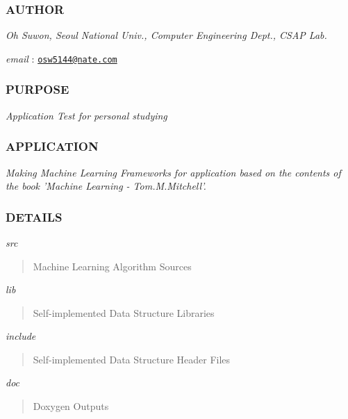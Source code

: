 \subsubsection*{A\-U\-T\-H\-O\-R}

{\itshape Oh Suwon, Seoul National Univ., Computer Engineering Dept., C\-S\-A\-P Lab.}

{\itshape email} \-: \href{mailto:osw5144@nate.com}{\tt osw5144@nate.\-com}

\subsubsection*{P\-U\-R\-P\-O\-S\-E}

{\itshape Application Test for personal studying}

\subsubsection*{A\-P\-P\-L\-I\-C\-A\-T\-I\-O\-N}

{\itshape Making Machine Learning Frameworks for application based on the contents of the book 'Machine Learning -\/ Tom.\-M.\-Mitchell'.}

\subsubsection*{D\-E\-T\-A\-I\-L\-S}

{\itshape src} \begin{quotation}
Machine Learning Algorithm Sources

\end{quotation}


{\itshape lib} \begin{quotation}
Self-\/implemented Data Structure Libraries

\end{quotation}


{\itshape include} \begin{quotation}
Self-\/implemented Data Structure Header Files

\end{quotation}


{\itshape doc} \begin{quotation}
Doxygen Outputs \end{quotation}
